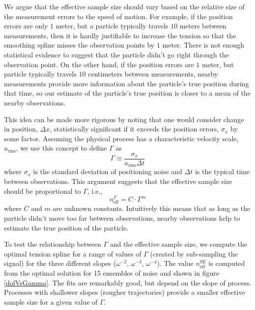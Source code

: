 \documentclass[10pt,journal]{IEEEtran}
\begin{document}
We argue that the effective sample size should vary based on the relative size of the measurement errors to the speed of motion. For example, if the position errors are only $1$ meter, but a particle typically travels $10$ meters between measurements, then it is hardly justifiable to increase the tension so that the smoothing spline misses the observation points by $1$ meter. There is not enough statistical evidence to suggest that the particle didn't go right through the observation point. On the other hand, if the position errors are $1$ meter, but particle typically travels $10$ centimeters between measurements, nearby measurements provide more information about the particle's true position during that time, so our estimate of the particle's true position is closer to a mean of the nearby observations.

This idea can be made more rigorous by noting that one would consider change in position, $\Delta x$, statistically significant if it exceeds the position errors, $\sigma_x$ by some factor.  Assuming the physical process has a characteristic velocity scale, $u_{\textrm{rms}}$, we use this concept to define $\Gamma$ as
\begin{equation}
\label{gamma_equation}
\Gamma \equiv \frac{\sigma_x}{u_{\textrm{rms}}\Delta t}
\end{equation}
where $\sigma_x$ is the standard deviation of positioning noise and $\Delta t$ is the typical time between observations. This argument suggests that the effective sample size should be proportional to $\Gamma$, i.e.,
\begin{equation}
n_{\textrm{eff}}^\Gamma = C \cdot \Gamma^m
\end{equation}
where $C$ and $m$ are unknown constants. Intuitively this means that as long as the particle didn't move too far between observations, nearby observations help to estimate the true position of the particle.

To test the relationship between $\Gamma$ and the effective sample size, we compute the optimal tension spline for a range of values of $\Gamma$ (created by sub-sampling the signal) for the three different slopes ($\omega^{-2}$, $\omega^{-3}$, $\omega^{-4}$). The value $n_{\textrm{eff}}^\textrm{SE}$ is computed from the optimal solution for 15 ensembles of noise and shown in figure \ref{dofVsGamma}. The fits are remarkably good, but depend on the slope of process. Processes with shallower slopes (rougher trajectories) provide a smaller effective sample size for a given value of $\Gamma$.
\end{document}
